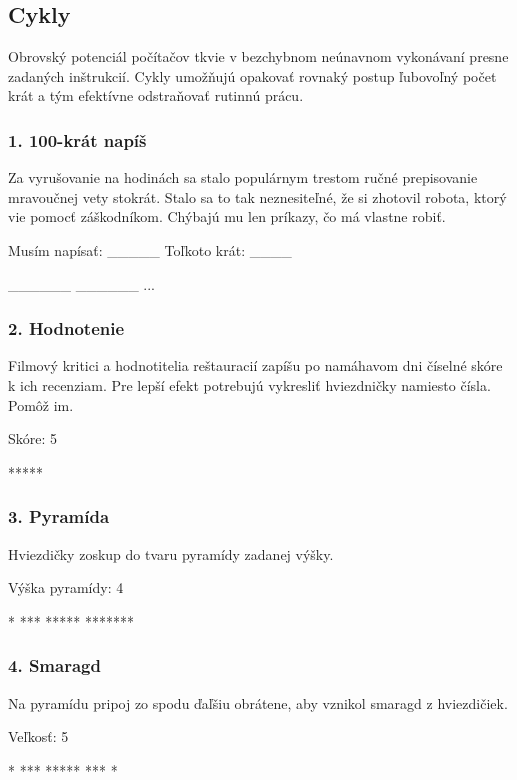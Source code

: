 \subsection{Cykly}
Obrovský potenciál počítačov tkvie v bezchybnom neúnavnom vykonávaní presne zadaných inštrukcií. Cykly umožňujú opakovať rovnaký postup ľubovoľný počet krát a tým efektívne odstraňovať rutinnú prácu.


\subsubsection*{1. 100-krát napíš}
Za vyrušovanie na hodinách sa stalo populárnym trestom ručné prepisovanie mravoučnej vety stokrát. Stalo sa to tak neznesiteľné, že si zhotovil robota, ktorý vie pomocť záškodníkom. Chýbajú mu len príkazy, čo má vlastne robiť.

\begin{code}
Musím napísať: _____
Toľkoto krát: ____

______
______
...
\end{code}


\subsubsection*{2. Hodnotenie}
Filmový kritici a hodnotitelia reštauracií zapíšu po namáhavom dni číselné skóre k ich recenziam. Pre lepší efekt potrebujú vykresliť hviezdničky namiesto čísla. Pomôž im.

\begin{code}
Skóre: 5

*****
\end{code}

\subsubsection*{3. Pyramída}
Hviezdičky zoskup do tvaru pyramídy zadanej výšky.

\begin{code}
Výška pyramídy: 4

   *
  ***
 *****
*******
\end{code}

\subsubsection*{4. Smaragd}
Na pyramídu pripoj zo spodu ďaľšiu obrátene, aby vznikol smaragd z hviezdičiek.

\begin{code}
Veľkosť: 5

  *
 ***
*****
 ***
  *
\end{code}

